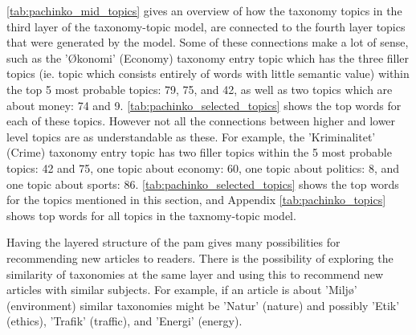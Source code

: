 \autoref{tab:pachinko_mid_topics} gives an overview of how the taxonomy topics in the third layer of the taxonomy-topic model, are connected to the fourth layer topics that were generated by the model.
Some of these connections make a lot of sense, such as the 'Økonomi' (Economy) taxonomy entry topic which has the three filler topics (ie. topic which consists entirely of words with little semantic value) within the top 5 most probable topics: 79, 75, and 42, as well as two topics which are about money: 74 and 9. \autoref{tab:pachinko_selected_topics} shows the top words for each of these topics.
However not all the connections between higher and lower level topics are as understandable as these. 
For example, the 'Kriminalitet' (Crime) taxonomy entry topic has two filler topics within the 5 most probable topics: 42 and 75, one topic about economy: 60, one topic about politics: 8, and one topic about sports: 86.
\autoref{tab:pachinko_selected_topics} shows the top words for the topics mentioned in this section, and Appendix \autoref{tab:pachinko_topics} shows top words for all topics in the taxnomy-topic model.

Having the layered structure of the \gls{pam} gives many possibilities for recommending new articles to readers.
There is the possibility of exploring the similarity of taxonomies at the same layer and using this to recommend new articles with similar subjects.
For example, if an article is about 'Miljø' (environment) similar taxonomies might be 'Natur' (nature) and possibly 'Etik' (ethics), 'Trafik' (traffic), and 'Energi' (energy).

